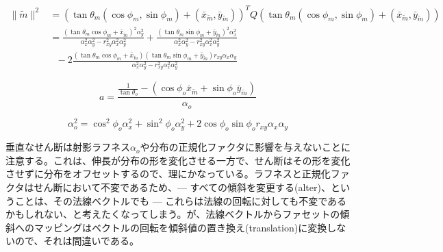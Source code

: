 \documentclass[a4j,xelatex,ja=standard]{bxjsarticle}
\begin{document}
\begin{equation}
    \begin{split}
        \|\tilde{m}\|^2 & = (\tan\theta_m(\cos\phi_m, \sin\phi_m) + (\bar{x}_{\tilde{m}}, \bar{y}_{\tilde{m}}))^T Q (\tan\theta_m(\cos\phi_m, \sin\phi_m) + (\bar{x}_{\tilde{m}}, \bar{y}_{\tilde{m}})) \\
                        & = \frac{(\tan\theta_m \cos\phi_m + \bar{x}_{\tilde{m}})^2 \alpha^2_y}{\alpha^2_x \alpha^2_y - r^2_{xy} \alpha^2_x \alpha^2_y} + \frac{(\tan\theta_m \sin\phi_m + \bar{y}_{\tilde{m}})^2 \alpha^2_x}{\alpha^2_x \alpha^2_y - r^2_{xy} \alpha^2_x \alpha^2_y} \\
                        & \text{  } - 2\frac{(\tan\theta_m \cos\phi_m + \bar{x}_{\tilde{m}})(\tan\theta_m \sin\phi_m + \bar{y}_{\tilde{m}}) r_{xy} \alpha_x \alpha_y}{\alpha^2_x \alpha^2_y - r^2_{xy} \alpha^2_x \alpha^2_y}
    \end{split}
    \label{eq:95}
\end{equation}

\begin{equation}
    a = \frac{\frac{1}{\tan\theta_o} - (\cos\phi_o \bar{x}_{\tilde{m}} + \sin\phi_o \bar{y}_{\tilde{m}})}{\alpha_o}
    \label{eq:96}
\end{equation}

\begin{equation}
    \alpha^2_o = \cos^2 \phi_o \alpha^2_x + \sin^2 \phi_o \alpha^2_y + 2 \cos\phi_o \sin\phi_o r_{xy} \alpha_x \alpha_y
    \label{eq:97}
\end{equation}

垂直なせん断は射影ラフネス$\alpha_o$や分布の正規化ファクタに影響を与えないことに注意する。これは、伸長が分布の形を変化させる一方で、せん断はその形を変化させずに分布をオフセットするので、理にかなっている。ラフネスと正規化ファクタはせん断において不変であるため、--- すべての傾斜を変更する(alter)、ということは、その法線ベクトルでも --- これらは法線の回転に対しても不変であるかもしれない、と考えたくなってしまう。が、法線ベクトルからファセットの傾斜へのマッピングはベクトルの回転を傾斜値の置き換え(translation)に変換しないので、それは間違いである。
\end{document}

